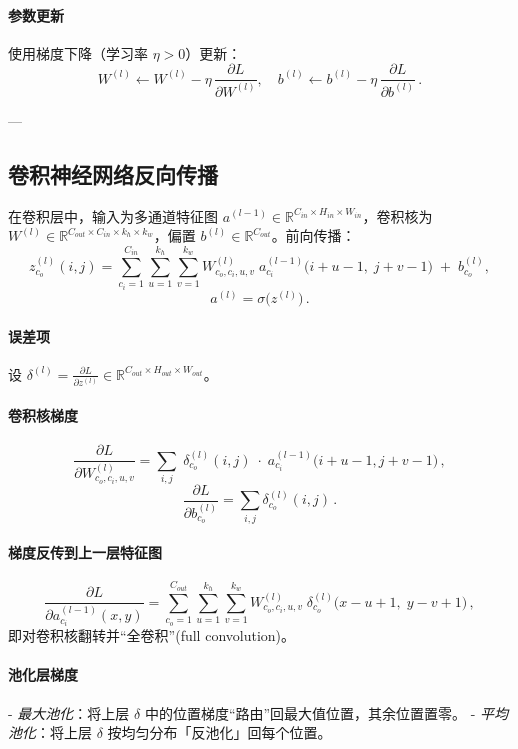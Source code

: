 \paragraph{参数更新}  
使用梯度下降（学习率 $\eta>0$）更新：
\[
W^{(l)} \leftarrow W^{(l)} - \eta\,\frac{\partial L}{\partial W^{(l)}},\quad
b^{(l)} \leftarrow b^{(l)} - \eta\,\frac{\partial L}{\partial b^{(l)}}\,.
\]

---

\subsection{卷积神经网络反向传播}

在卷积层中，输入为多通道特征图 $a^{(l-1)}\in\mathbb R^{C_{in}\times H_{in}\times W_{in}}$，卷积核为 $W^{(l)}\in\mathbb R^{C_{out}\times C_{in}\times k_h\times k_w}$，偏置 $b^{(l)}\in\mathbb R^{C_{out}}$。前向传播：
\[
z^{(l)}_{c_o}(i,j)
=\sum_{c_i=1}^{C_{in}}\sum_{u=1}^{k_h}\sum_{v=1}^{k_w}
W^{(l)}_{c_o,c_i,u,v}\;a^{(l-1)}_{c_i}\bigl(i+u-1,\;j+v-1\bigr)
\;+\;b^{(l)}_{c_o},
\]
\[
a^{(l)} = \sigma\bigl(z^{(l)}\bigr)\,.
\]

\paragraph{误差项}  
设 \(\delta^{(l)} = \tfrac{\partial L}{\partial z^{(l)}}\in\mathbb R^{C_{out}\times H_{out}\times W_{out}}\)。

\paragraph{卷积核梯度}  
\[
\frac{\partial L}{\partial W^{(l)}_{c_o,c_i,u,v}}
=\sum_{i,j}\;
\delta^{(l)}_{c_o}(i,j)\;\cdot\;
a^{(l-1)}_{c_i}\bigl(i+u-1,j+v-1\bigr)\,,
\]
\[
\frac{\partial L}{\partial b^{(l)}_{c_o}}
=\sum_{i,j}\delta^{(l)}_{c_o}(i,j)\,.
\]

\paragraph{梯度反传到上一层特征图}  
\[
\frac{\partial L}{\partial a^{(l-1)}_{c_i}(x,y)}
=\sum_{c_o=1}^{C_{out}}\sum_{u=1}^{k_h}\sum_{v=1}^{k_w}
W^{(l)}_{c_o,c_i,u,v}\;
\delta^{(l)}_{c_o}\bigl(x-u+1,\;y-v+1\bigr)\,,
\]
即对卷积核翻转并“全卷积”(full convolution)。

\paragraph{池化层梯度}  
- \emph{最大池化}：将上层 $\delta$ 中的位置梯度“路由”回最大值位置，其余位置置零。  
- \emph{平均池化}：将上层 $\delta$ 按均匀分布「反池化」回每个位置。

